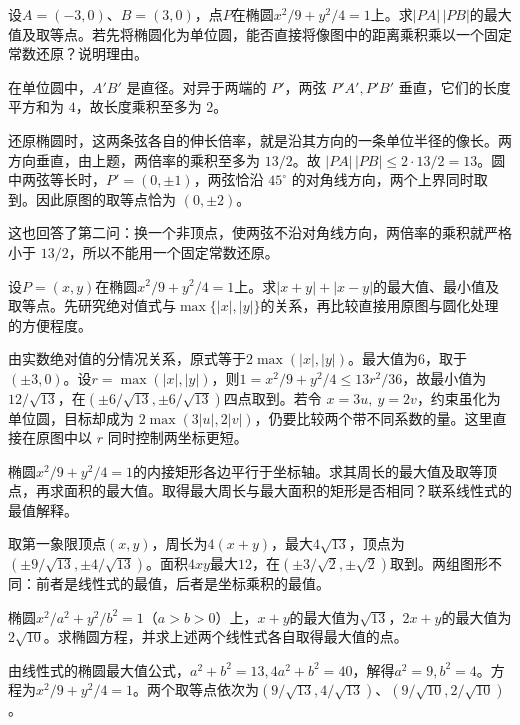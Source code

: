 设\(A=(-3,0)\)、\(B=(3,0)\)，点\(P\)在椭圆\(x^2/9+y^2/4=1\)上。求\(|PA|\,|PB|\)的最大值及取等点。若先将椭圆化为单位圆，能否直接将像图中的距离乘积乘以一个固定常数还原？说明理由。
\par
\solutionanswer
在单位圆中，\(A'B'\) 是直径。对异于两端的 \(P'\)，两弦 \(P'A',P'B'\) 垂直，它们的长度平方和为 \(4\)，故长度乘积至多为 \(2\)。

还原椭圆时，这两条弦各自的伸长倍率，就是沿其方向的一条单位半径的像长。两方向垂直，由上题，两倍率的乘积至多为 \(13/2\)。故 \(|PA|\,|PB|\le 2\cdot13/2=13\)。圆中两弦等长时，\(P'=(0,\pm1)\)，两弦恰沿 \(45^\circ\) 的对角线方向，两个上界同时取到。因此原图的取等点恰为 \((0,\pm2)\)。

这也回答了第二问：换一个非顶点，使两弦不沿对角线方向，两倍率的乘积就严格小于 \(13/2\)，所以不能用一个固定常数还原。


设\(P=(x,y)\)在椭圆\(x^2/9+y^2/4=1\)上。求\(|x+y|+|x-y|\)的最大值、最小值及取等点。先研究绝对值式与\(\max\{|x|,|y|\}\)的关系，再比较直接用原图与圆化处理的方便程度。
\par
\solutionanswer
由实数绝对值的分情况关系，原式等于\(2\max(|x|,|y|)\)。最大值为\(6\)，取于\((\pm3,0)\)。设\(r=\max(|x|,|y|)\)，则\(1=x^2/9+y^2/4\le13r^2/36\)，故最小值为\(12/\sqrt{13}\)，在\((\pm6/\sqrt{13},\pm6/\sqrt{13})\)四点取到。若令 \(x=3u,\ y=2v\)，约束虽化为单位圆，目标却成为 \(2\max(3|u|,2|v|)\)，仍要比较两个带不同系数的量。这里直接在原图中以 \(r\) 同时控制两坐标更短。


椭圆\(x^2/9+y^2/4=1\)的内接矩形各边平行于坐标轴。求其周长的最大值及取等顶点，再求面积的最大值。取得最大周长与最大面积的矩形是否相同？联系线性式的最值解释。
\par
\solutionanswer
取第一象限顶点\((x,y)\)，周长为\(4(x+y)\)，最大\(4\sqrt{13}\)，顶点为\((\pm9/\sqrt{13},\pm4/\sqrt{13})\)。面积\(4xy\)最大\(12\)，在\((\pm3/\sqrt2,\pm\sqrt2)\)取到。两组图形不同：前者是线性式的最值，后者是坐标乘积的最值。


椭圆\(x^2/a^2+y^2/b^2=1\)（\(a>b>0\)）上，\(x+y\)的最大值为\(\sqrt{13}\)，\(2x+y\)的最大值为\(2\sqrt{10}\)。求椭圆方程，并求上述两个线性式各自取得最大值的点。
\par
\solutionanswer
由线性式的椭圆最大值公式，\(a^2+b^2=13,4a^2+b^2=40\)，解得\(a^2=9,b^2=4\)。方程为\(x^2/9+y^2/4=1\)。两个取等点依次为\((9/\sqrt{13},4/\sqrt{13})\)、\((9/\sqrt{10},2/\sqrt{10})\)。


